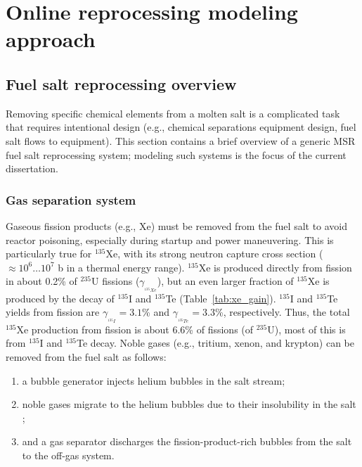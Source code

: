 \chapter{Online reprocessing modeling approach}
\section{Fuel salt reprocessing overview} \label{sec:reproc-plant}
Removing specific chemical elements from a molten salt is a complicated 
task that requires intentional design (e.g., chemical separations equipment 
design, fuel salt flows to equipment). This section contains a brief overview 
of a generic \gls{MSR} fuel salt reprocessing system; modeling such systems is 
the focus of the current dissertation.

\subsection{Gas separation system} \label{sec:gas-separ}
Gaseous fission products (e.g., Xe) must be removed from the fuel salt 
to avoid reactor poisoning, especially during startup and power maneuvering. 
This is particularly true for $^{135}$Xe, with its strong neutron capture 
cross section ($\approx10^6\dots10^7$ b in a thermal energy range). $^{135}$Xe 
is produced directly from fission in about 0.2\% of $^{235}$U fissions 
($\gamma_{_{^{135}Xe}}$), but an even larger fraction of $^{135}$Xe is 
produced by the decay of $^{135}$I and $^{135}$Te (Table~\ref{tab:xe_gain}). 
$^{135}$I and $^{135}$Te yields from fission are 
$\gamma_{_{^{135}I}}\!=3.1$\% and $\gamma_{_{^{135}Te}}\!=3.3$\%, 
respectively. Thus, the total $^{135}$Xe production from fission is about 
6.6\% of fissions (of $^{235}$U), most of this is from $^{135}$I and 
$^{135}$Te decay. Noble gases (e.g., tritium, xenon, and krypton) can be 
removed from the fuel salt as follows:
\begin{enumerate}[label=(\alph*)]
	\item a bubble generator injects helium bubbles in the salt stream;
	\item noble gases migrate to the helium bubbles due to their insolubility 
	in the salt \cite{robertson_conceptual_1971};
	\item and a gas separator discharges the fission-product-rich bubbles from 
	the salt to the off-gas system.
\end{enumerate}
